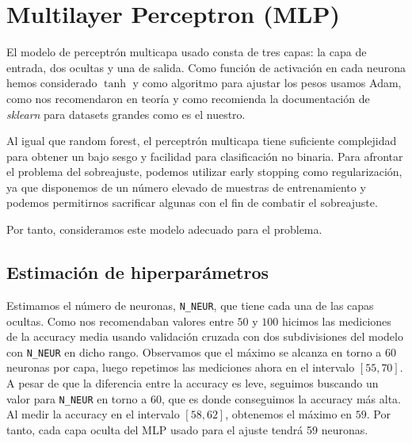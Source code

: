 \documentclass[a4]{article}
\begin{document}
\section{Multilayer Perceptron (MLP)}

El modelo de perceptrón multicapa usado consta de tres capas: la capa
de entrada, dos ocultas y una de salida. Como función de activación en
cada neurona hemos considerado $\tanh$ y como algoritmo para ajustar
los pesos usamos Adam, como nos recomendaron en teoría y como
recomienda la documentación de \textit{sklearn} para datasets grandes
como es el nuestro.

Al igual que random forest, el perceptrón multicapa tiene suficiente
complejidad para obtener un bajo sesgo y facilidad para clasificación
no binaria. Para afrontar el problema del sobreajuste, podemos
utilizar early stopping como regularización, ya que disponemos de un
número elevado de muestras de entrenamiento y podemos permitirnos
sacrificar algunas con el fin de combatir el sobreajuste.

Por tanto, consideramos este modelo adecuado para el problema.

\subsection{Estimación de hiperparámetros}

Estimamos el número de neuronas, \texttt{N\_NEUR}, que tiene cada una
de las capas ocultas. Como nos recomendaban valores entre $50$ y $100$
hicimos las mediciones de la accuracy media usando validación cruzada
con dos subdivisiones del modelo con \texttt{N\_NEUR} en dicho
rango. Observamos que el máximo se alcanza en torno a $60$ neuronas
por capa, luego repetimos las mediciones ahora en el intervalo
$[55,70]$. A pesar de que la diferencia entre la accuracy es leve,
seguimos buscando un valor para \texttt{N\_NEUR} en torno a $60$, que
es donde conseguimos la accuracy más alta. Al medir la accuracy en el
intervalo $[58,62]$, obtenemos el máximo en $59$. Por tanto, cada capa
oculta del MLP usado para el ajuste tendrá 59 neuronas.
\end{document}
